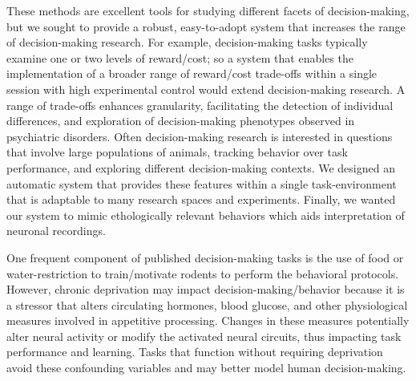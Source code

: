 \documentclass{article}
\begin{document}
\vspace{1em}

These methods are excellent tools for studying different facets of decision-making, but we sought to provide a robust, easy-to-adopt system that increases the range of decision-making research. For example, decision-making tasks typically examine one or two levels of reward/cost\cite{brunton2013rats, orsini2023age, friedman2017chronic}; so a system that enables the implementation of a broader range of reward/cost trade-offs within a single session with high experimental control would extend decision-making research. A range of trade-offs enhances granularity, facilitating the detection of individual differences, and exploration of decision-making phenotypes observed in psychiatric disorders\cite{amemori2021causal, ironside2020approach}. Often decision-making research is interested in questions that involve large populations of animals, tracking behavior over task performance, and exploring different decision-making contexts\cite{friedman2015corticostriatal, friedman2017chronic, friedman2020striosomes}. We designed an automatic system\cite{vogt2021automated} that provides these features within a single task-environment that is adaptable to many research spaces and experiments. Finally, we wanted our system to mimic ethologically relevant behaviors\cite{juavinett2018decision} which aids interpretation of neuronal recordings.

\vspace{1em}

One frequent component of published decision-making tasks is the use
of food\cite{johnson2007neural, o2018low, kapanaiah2021low, orsini2023age, friedman2017chronic, foscue2012characterization} or water-restriction\cite{kira2023distributed, de2023freibox, lottem2018activation, brunton2013rats, friedman2020striosomes} to train/motivate rodents to perform the behavioral protocols. However, chronic deprivation may impact decision-making/behavior because it is a stressor that alters circulating hormones, blood glucose, and other physiological measures involved in appetitive processing\cite{stone2020ghrelin}. Changes in these measures potentially alter neural activity or modify the activated neural circuits, thus impacting task performance and learning\cite{goltstein2018food}. Tasks that function without requiring deprivation avoid these confounding variables and may better model human decision-making.

\vspace{1em}
\end{document}
